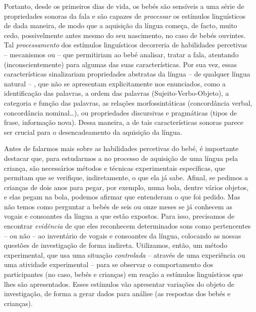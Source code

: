 \documentclass[output=paper]{LSP/langsci}
\begin{document}
Portanto, desde os primeiros dias de vida, os bebés são sensíveis a uma série de propriedades sonoras da fala e são capazes de \textit{processar} os estímulos linguísticos de dada maneira, de modo que a aquisição da língua começa, de facto, muito cedo, possivelmente antes mesmo do seu nascimento, no caso de bebés ouvintes. Tal \textit{processamento} dos estímulos linguísticos decorreria de habilidades percetivas -- mecanismos ou  -- que permitiriam ao bebé analisar, tratar a fala, atentando (inconscientemente) para algumas das suas características. Por sua vez, essas características sinalizariam propriedades abstratas da língua -- de qualquer língua natural -- , que não se apresentam explicitamente nos enunciados, como a identificação das palavras, a ordem das palavras (Sujeito-Verbo-Objeto), a categoria e função das palavras, as relações morfossintáticas (concordância verbal, concordância nominal\ldots), ou propriedades discursivas e pragmáticas (tipos de frase, informação nova). Dessa maneira, a  de tais características sonoras parece ser crucial para o desencadeamento da aquisição da língua.

Antes de falarmos mais sobre as habilidades percetivas do bebé, é importante destacar que, para estudarmos a  no processo de aquisição de uma língua pela criança, são necessários métodos e técnicas experimentais específicas, que permitam que se verifique, indiretamente, o que ela já sabe. Afinal, se pedimos a crianças de dois anos para pegar, por exemplo, numa bola, dentre vários objetos, e elas pegam na bola, podemos afirmar que entenderam o que foi pedido. Mas não temos como perguntar a bebés de seis ou onze meses se já conhecem as vogais e consoantes da língua a que estão expostos. Para isso, precisamos de encontrar \textit{evidência} de que eles reconhecem determinados sons como pertencentes -- ou não -- ao inventário de vogais e consoantes da língua, colocando as nossas questões de investigação de forma indireta. Utilizamos, então, um método experimental, que usa uma situação \textit{controlada} -- através de uma experiência ou uma atividade experimental -- para se observar o comportamento dos participantes (no caso, bebés e crianças) em reação a estímulos linguísticos que lhes são apresentados. Esses estímulos vão apresentar variações do objeto de investigação, de forma a gerar dados para análise (as respostas dos bebés e crianças). 
\end{document}
